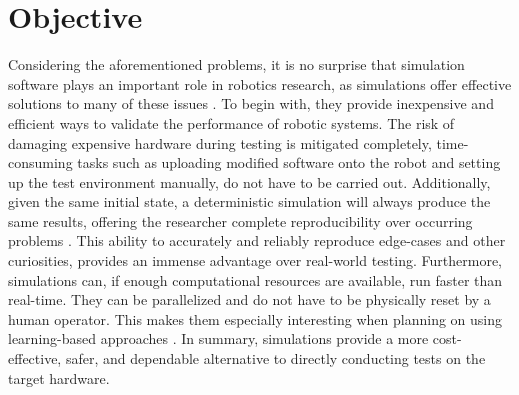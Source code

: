 



\section{Objective}
Considering the aforementioned problems, it is no surprise that simulation software plays an important role in robotics research, as simulations offer effective solutions to many of these issues \parencite{afzal2020study}.
To begin with, they provide inexpensive and efficient ways to validate the performance of robotic systems.
The risk of damaging expensive hardware during testing is mitigated completely, time-consuming tasks such as uploading modified software onto the robot and setting up the test environment manually, do not have to be carried out.
Additionally, given the same initial state, a deterministic simulation will always produce the same results, offering the researcher complete reproducibility over occurring problems \parencite{choi2021use}.
This ability to accurately and reliably reproduce edge-cases and other curiosities, provides an immense advantage over real-world testing.
Furthermore, simulations can, if enough computational resources are available, run faster than real-time.
They can be parallelized and do not have to be physically reset by a human operator.
This makes them especially interesting when planning on using learning-based approaches \parencite{collins2021review}.
In summary, simulations provide a more cost-effective, safer, and dependable alternative to directly conducting tests on the target hardware.

